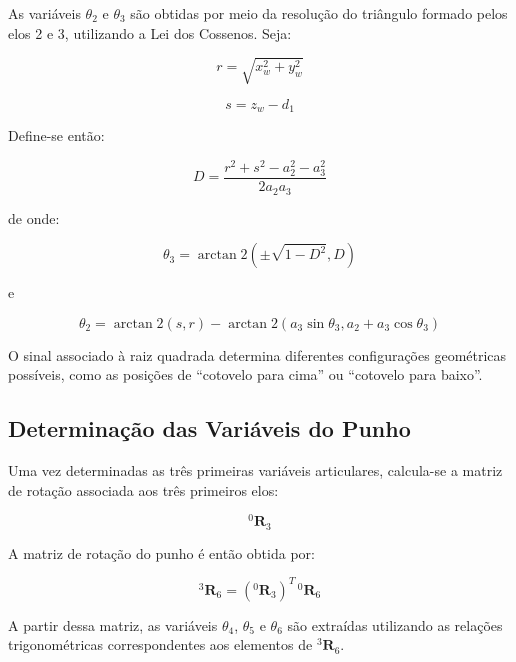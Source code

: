 As variáveis $\theta_2$ e $\theta_3$ são obtidas por meio da resolução do triângulo formado pelos elos 2 e 3, utilizando a Lei dos Cossenos. Seja:

\begin{equation}
r = \sqrt{x_w^2 + y_w^2}
\end{equation}

\begin{equation}
s = z_w - d_1
\end{equation}

Define-se então:

\begin{equation}
D = \frac{r^2 + s^2 - a_2^2 - a_3^2}{2 a_2 a_3}
\end{equation}

de onde:

\begin{equation}
\theta_3 = \arctan2(\pm\sqrt{1-D^2}, D)
\end{equation}

e

\begin{equation}
\theta_2 = \arctan2(s, r) - \arctan2(a_3 \sin\theta_3, a_2 + a_3 \cos\theta_3)
\end{equation}

O sinal associado à raiz quadrada determina diferentes configurações geométricas possíveis, como as posições de ``cotovelo para cima'' ou ``cotovelo para baixo''.

\subsection{Determinação das Variáveis do Punho}

Uma vez determinadas as três primeiras variáveis articulares, calcula-se a matriz de rotação associada aos três primeiros elos:

\begin{equation}
^0\mathbf{R}_3
\end{equation}

A matriz de rotação do punho é então obtida por:

\begin{equation}
^3\mathbf{R}_6 = (^0\mathbf{R}_3)^T \, ^0\mathbf{R}_6
\end{equation}

A partir dessa matriz, as variáveis $\theta_4$, $\theta_5$ e $\theta_6$ são extraídas utilizando as relações trigonométricas correspondentes aos elementos de $^3\mathbf{R}_6$.

